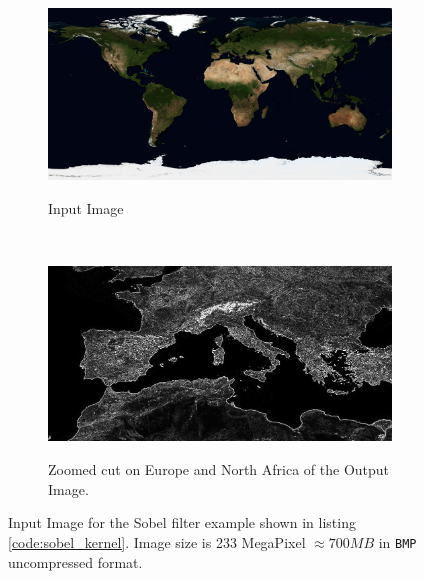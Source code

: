 \begin{figure}
    \begin{subfigure}{1.0\textwidth}
        \caption{Input Image}
        \includegraphics[width=\linewidth]{./images/opencal/sobel_input}
        \label{fig:sobel_input}
        
    \end{subfigure}    
    \endminipage\hfill \\
        \begin{subfigure}{1.0\textwidth}
        \includegraphics[width=\linewidth]{./images/opencal/sobel_output_detail}
        \label{fig:sobel_output_detail}
        \caption{Zoomed cut on Europe and North Africa of the Output Image.}
    \end{subfigure}
    \endminipage
        \caption[Input Image for the Sobel filter example shown in listing \ref{code:sobel_kernel}.]{Input Image for the Sobel filter example shown in listing \ref{code:sobel_kernel}. Image size is 233 MegaPixel $\approx 700  \si{MB}$ in \texttt{BMP} uncompressed format.}
        \label{fig:sobel_result}
\end{figure}



